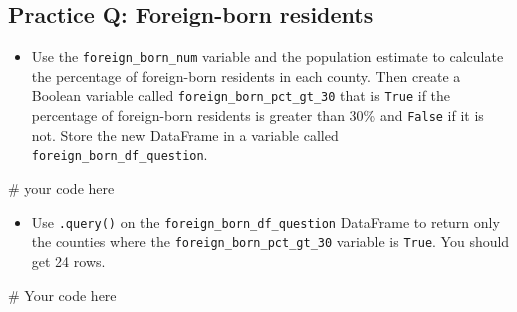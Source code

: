 \documentclass[
  letterpaper,
  DIV=11,
  numbers=noendperiod]{scrreprt}
\newenvironment{Shaded}{\begin{snugshade}}{\end{snugshade}}
\newcommand{\CommentTok}[1]{\textcolor[rgb]{0.37,0.37,0.37}{#1}}
\providecommand{\tightlist}{%
  \setlength{\itemsep}{0pt}\setlength{\parskip}{0pt}}\usepackage{longtable,booktabs,array}
\begin{document}
\begin{tcolorbox}[enhanced jigsaw, colframe=quarto-callout-tip-color-frame, opacityback=0, titlerule=0mm, bottomrule=.15mm, breakable, leftrule=.75mm, colbacktitle=quarto-callout-tip-color!10!white, title=\textcolor{quarto-callout-tip-color}{\faLightbulb}\hspace{0.5em}{Practice}, rightrule=.15mm, coltitle=black, opacitybacktitle=0.6, colback=white, left=2mm, arc=.35mm, toptitle=1mm, bottomtitle=1mm, toprule=.15mm]

\subsection{Practice Q: Foreign-born
residents}\label{practice-q-foreign-born-residents}

\begin{itemize}
\tightlist
\item
  Use the \texttt{foreign\_born\_num} variable and the population
  estimate to calculate the percentage of foreign-born residents in each
  county. Then create a Boolean variable called
  \texttt{foreign\_born\_pct\_gt\_30} that is \texttt{True} if the
  percentage of foreign-born residents is greater than 30\% and
  \texttt{False} if it is not. Store the new DataFrame in a variable
  called \texttt{foreign\_born\_df\_question}.
\end{itemize}

\begin{Shaded}
\begin{Highlighting}[]
\CommentTok{\# your code here}
\end{Highlighting}
\end{Shaded}

\begin{itemize}
\tightlist
\item
  Use \texttt{.query()} on the \texttt{foreign\_born\_df\_question}
  DataFrame to return only the counties where the
  \texttt{foreign\_born\_pct\_gt\_30} variable is \texttt{True}. You
  should get 24 rows.
\end{itemize}

\begin{Shaded}
\begin{Highlighting}[]
\CommentTok{\# Your code here}
\end{Highlighting}
\end{Shaded}

\end{tcolorbox}
\end{document}
